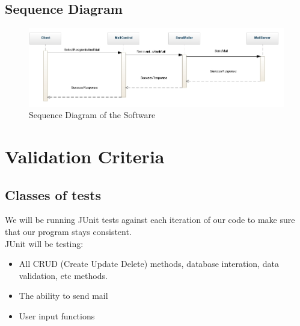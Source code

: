 \documentclass{article}
\begin{document}
\subsection*{Sequence Diagram}
\begin{figure}[H]
\centering
\includegraphics[width=150mm]{img/finalDiagrams/SequenceDiagram.jpg}
\caption{Sequence Diagram of the Software \label{sequence}}
\end{figure}





\section{Validation Criteria}

\subsection{Classes of tests}
We will be running JUnit tests against each iteration of our code to make sure that our program stays consistent. \\

JUnit will be testing:
\begin{itemize}
\item All CRUD (Create Update Delete) methods, database interation, data validation, etc methods.
\item The ability to send mail
\item User input functions
\end{itemize}
\end{document}
